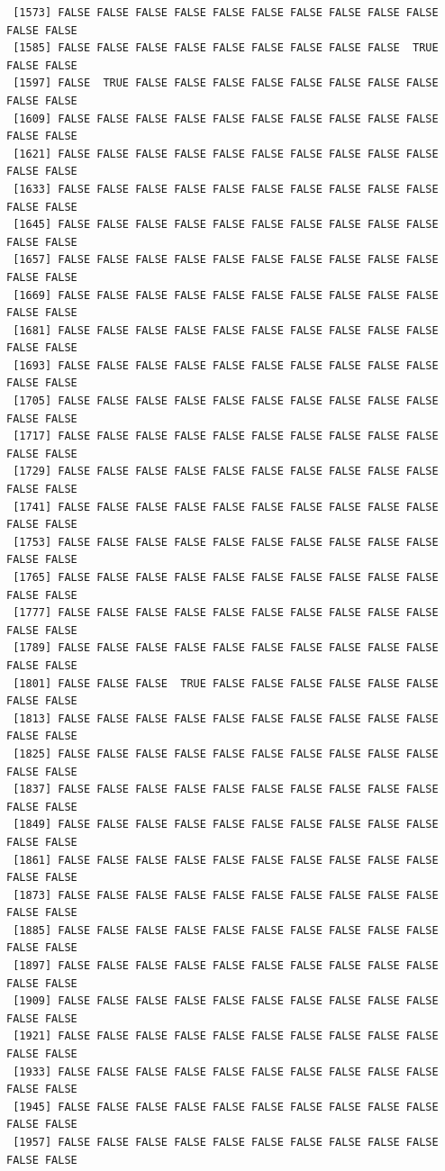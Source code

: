 \documentclass[
  a4paper,
  DIV=11,
  numbers=noendperiod]{scrartcl}
\begin{document}
\begin{verbatim}
 [1573] FALSE FALSE FALSE FALSE FALSE FALSE FALSE FALSE FALSE FALSE FALSE FALSE
 [1585] FALSE FALSE FALSE FALSE FALSE FALSE FALSE FALSE FALSE  TRUE FALSE FALSE
 [1597] FALSE  TRUE FALSE FALSE FALSE FALSE FALSE FALSE FALSE FALSE FALSE FALSE
 [1609] FALSE FALSE FALSE FALSE FALSE FALSE FALSE FALSE FALSE FALSE FALSE FALSE
 [1621] FALSE FALSE FALSE FALSE FALSE FALSE FALSE FALSE FALSE FALSE FALSE FALSE
 [1633] FALSE FALSE FALSE FALSE FALSE FALSE FALSE FALSE FALSE FALSE FALSE FALSE
 [1645] FALSE FALSE FALSE FALSE FALSE FALSE FALSE FALSE FALSE FALSE FALSE FALSE
 [1657] FALSE FALSE FALSE FALSE FALSE FALSE FALSE FALSE FALSE FALSE FALSE FALSE
 [1669] FALSE FALSE FALSE FALSE FALSE FALSE FALSE FALSE FALSE FALSE FALSE FALSE
 [1681] FALSE FALSE FALSE FALSE FALSE FALSE FALSE FALSE FALSE FALSE FALSE FALSE
 [1693] FALSE FALSE FALSE FALSE FALSE FALSE FALSE FALSE FALSE FALSE FALSE FALSE
 [1705] FALSE FALSE FALSE FALSE FALSE FALSE FALSE FALSE FALSE FALSE FALSE FALSE
 [1717] FALSE FALSE FALSE FALSE FALSE FALSE FALSE FALSE FALSE FALSE FALSE FALSE
 [1729] FALSE FALSE FALSE FALSE FALSE FALSE FALSE FALSE FALSE FALSE FALSE FALSE
 [1741] FALSE FALSE FALSE FALSE FALSE FALSE FALSE FALSE FALSE FALSE FALSE FALSE
 [1753] FALSE FALSE FALSE FALSE FALSE FALSE FALSE FALSE FALSE FALSE FALSE FALSE
 [1765] FALSE FALSE FALSE FALSE FALSE FALSE FALSE FALSE FALSE FALSE FALSE FALSE
 [1777] FALSE FALSE FALSE FALSE FALSE FALSE FALSE FALSE FALSE FALSE FALSE FALSE
 [1789] FALSE FALSE FALSE FALSE FALSE FALSE FALSE FALSE FALSE FALSE FALSE FALSE
 [1801] FALSE FALSE FALSE  TRUE FALSE FALSE FALSE FALSE FALSE FALSE FALSE FALSE
 [1813] FALSE FALSE FALSE FALSE FALSE FALSE FALSE FALSE FALSE FALSE FALSE FALSE
 [1825] FALSE FALSE FALSE FALSE FALSE FALSE FALSE FALSE FALSE FALSE FALSE FALSE
 [1837] FALSE FALSE FALSE FALSE FALSE FALSE FALSE FALSE FALSE FALSE FALSE FALSE
 [1849] FALSE FALSE FALSE FALSE FALSE FALSE FALSE FALSE FALSE FALSE FALSE FALSE
 [1861] FALSE FALSE FALSE FALSE FALSE FALSE FALSE FALSE FALSE FALSE FALSE FALSE
 [1873] FALSE FALSE FALSE FALSE FALSE FALSE FALSE FALSE FALSE FALSE FALSE FALSE
 [1885] FALSE FALSE FALSE FALSE FALSE FALSE FALSE FALSE FALSE FALSE FALSE FALSE
 [1897] FALSE FALSE FALSE FALSE FALSE FALSE FALSE FALSE FALSE FALSE FALSE FALSE
 [1909] FALSE FALSE FALSE FALSE FALSE FALSE FALSE FALSE FALSE FALSE FALSE FALSE
 [1921] FALSE FALSE FALSE FALSE FALSE FALSE FALSE FALSE FALSE FALSE FALSE FALSE
 [1933] FALSE FALSE FALSE FALSE FALSE FALSE FALSE FALSE FALSE FALSE FALSE FALSE
 [1945] FALSE FALSE FALSE FALSE FALSE FALSE FALSE FALSE FALSE FALSE FALSE FALSE
 [1957] FALSE FALSE FALSE FALSE FALSE FALSE FALSE FALSE FALSE FALSE FALSE FALSE

\end{verbatim}
\end{document}
